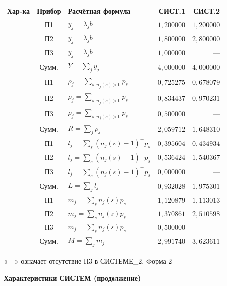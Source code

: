 \documentclass[12pt,a4paper]{article}
\newcommand{\formtitle}[2]{\noindent\hfill Форма #1\par\begin{center}\textbf{#2}\end{center}}
\begin{document}
\begin{center}\small\setlength{\tabcolsep}{3pt}\renewcommand{\arraystretch}{2.0}
\begin{tabular}{|p{27mm}|c|>{\centering\arraybackslash}p{64mm}|r|r|}\hline
Хар-ка&Прибор&Расчётная формула&СИСТ.1&СИСТ.2\\\hline
{}&П1&$y_j=\lambda_jb$&$1{,}200000$&$1{,}200000$\\
&П2&$y_j=\lambda_jb$&$1{,}800000$&$2{,}800000$\\
&П3&$y_j=\lambda_jb$&$1{,}000000$&---\\
&Сумм.&$Y=\sum_jy_j$&$4{,}000000$&$4{,}000000$\\\hline
{}&П1&$\rho_j=\sum_{s:n_j(s)>0}p_s$&$0{,}725275$&$0{,}678079$\\
&П2&$\rho_j=\sum_{s:n_j(s)>0}p_s$&$0{,}834437$&$0{,}970231$\\
&П3&$\rho_j=\sum_{s:n_j(s)>0}p_s$&$0{,}500000$&---\\
&Сумм.&$R=\sum_j\rho_j$&$2{,}059712$&$1{,}648310$\\\hline
{}&П1&$l_j=\sum_s(n_j(s)-1)^+p_s$&$0{,}395604$&$0{,}434934$\\
&П2&$l_j=\sum_s(n_j(s)-1)^+p_s$&$0{,}536424$&$1{,}540367$\\
&П3&$l_j=\sum_s(n_j(s)-1)^+p_s$&$0{,}000000$&---\\
&Сумм.&$L=\sum_jl_j$&$0{,}932028$&$1{,}975301$\\\hline
{}&П1&$m_j=\sum_sn_j(s)p_s$&$1{,}120879$&$1{,}113013$\\
&П2&$m_j=\sum_sn_j(s)p_s$&$1{,}370861$&$2{,}510598$\\
&П3&$m_j=\sum_sn_j(s)p_s$&$0{,}500000$&---\\
&Сумм.&$M=\sum_jm_j$&$2{,}991740$&$3{,}623611$\\\hline
\end{tabular}\end{center}
\noindent\small «---» означает отсутствие П3 в СИСТЕМЕ\_2.\normalsize
\newpage
\formtitle{2}{Характеристики СИСТЕМ (продолжение)}
\end{document}
